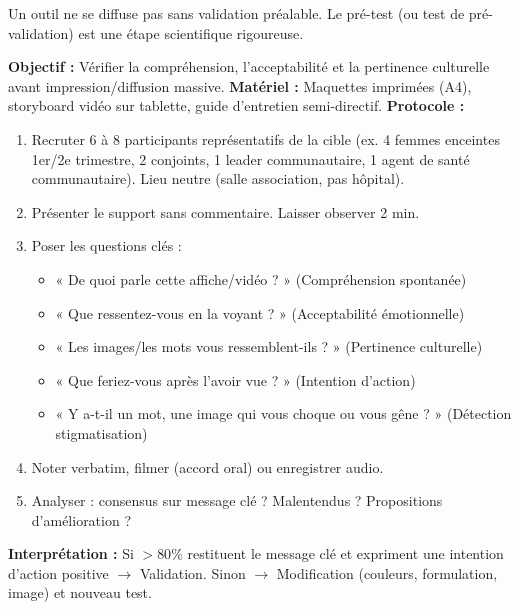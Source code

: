 \documentclass[11pt]{article}
\begin{document}
Un outil ne se diffuse pas sans validation préalable. Le pré-test (ou test de pré-validation) est une étape scientifique rigoureuse.

\begin{experience}
\textbf{Objectif :} Vérifier la compréhension, l'acceptabilité et la pertinence culturelle avant impression/diffusion massive.
\textbf{Matériel :} Maquettes imprimées (A4), storyboard vidéo sur tablette, guide d'entretien semi-directif.
\textbf{Protocole :}
\begin{enumerate}
    \item Recruter 6 à 8 participants représentatifs de la cible (ex. 4 femmes enceintes 1er/2e trimestre, 2 conjoints, 1 leader communautaire, 1 agent de santé communautaire). Lieu neutre (salle association, pas hôpital).
    \item Présenter le support sans commentaire. Laisser observer 2 min.
    \item Poser les questions clés :
    \begin{itemize}
        \item « De quoi parle cette affiche/vidéo ? » (Compréhension spontanée)
        \item « Que ressentez-vous en la voyant ? » (Acceptabilité émotionnelle)
        \item « Les images/les mots vous ressemblent-ils ? » (Pertinence culturelle)
        \item « Que feriez-vous après l'avoir vue ? » (Intention d'action)
        \item « Y a-t-il un mot, une image qui vous choque ou vous gêne ? » (Détection stigmatisation)
    \end{itemize}
    \item Noter verbatim, filmer (accord oral) ou enregistrer audio.
    \item Analyser : consensus sur message clé ? Malentendus ? Propositions d'amélioration ?
\end{enumerate}
\textbf{Interprétation :} Si $> 80\%$ restituent le message clé et expriment une intention d'action positive $\rightarrow$ Validation. Sinon $\rightarrow$ Modification (couleurs, formulation, image) et nouveau test.
\end{experience}
\end{document}

